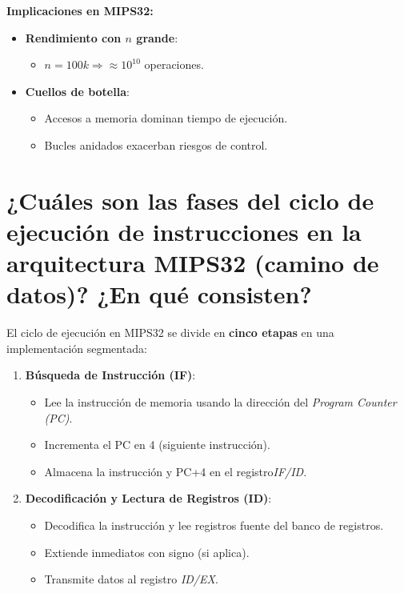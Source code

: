 \documentclass{article}
\begin{document}
\begin{itemize}
\begin{itemize}[label=--]
\textbf{Implicaciones en MIPS32:}
\begin{itemize}
    \item \textbf{Rendimiento con $n$ grande}: 
    \begin{itemize}
        \item $n=100k \Rightarrow \approx 10^{10}$ operaciones.
    \end{itemize}
    \item \textbf{Cuellos de botella}:
    \begin{itemize}
        \item Accesos a memoria dominan tiempo de ejecución.
        \item Bucles anidados exacerban riesgos de control.
    \end{itemize}
\end{itemize}

\section{¿Cuáles son las fases del ciclo de ejecución de instrucciones en la arquitectura MIPS32 
(camino de datos)? ¿En qué consisten? }

El ciclo de ejecución en MIPS32 se divide en \textbf{cinco etapas} en una implementación segmentada:

\begin{enumerate}
  \item \textbf{Búsqueda de Instrucción (IF)}:
    \begin{itemize}
      \item Lee la instrucción de memoria usando la dirección del \textit{Program Counter (PC)}.
      \item Incrementa el PC en 4 (siguiente instrucción).
      \item Almacena la instrucción y PC+4 en el registro\textit{IF/ID}.
    \end{itemize}
  
  \item \textbf{Decodificación y Lectura de Registros (ID)}:
    \begin{itemize}
      \item Decodifica la instrucción y lee registros fuente del banco de registros.
      \item Extiende inmediatos con signo (si aplica).
      \item Transmite datos al registro \textit{ID/EX}.
    \end{itemize}
  

\end{enumerate}
\end{itemize}
\end{itemize}
\end{document}
